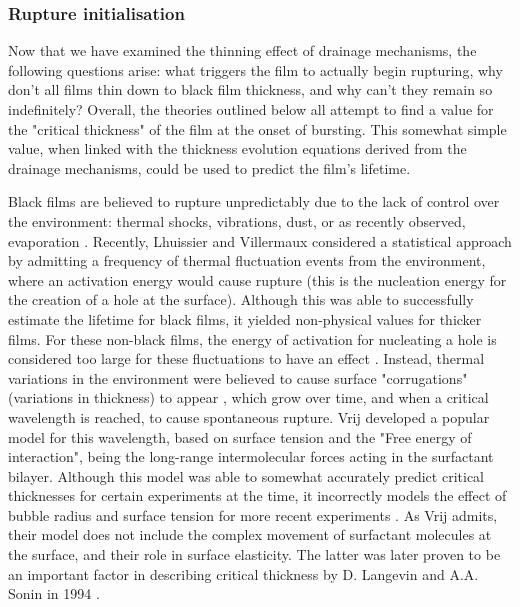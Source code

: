 \documentclass[a4paper,12pt]{article}
\numberwithin{equation}{section}
\numberwithin{figure}{section}
\numberwithin{table}{section}
\begin{document}
\subsubsection{Rupture initialisation}
Now that we have examined the thinning effect of drainage mechanisms, the following questions arise: what triggers the film to actually begin rupturing, why don't all films thin down to black film thickness, and why can't they remain so indefinitely? Overall, the theories outlined below all attempt to find a value for the "critical thickness" of the film at the onset of bursting. This somewhat simple value, when linked with the thickness evolution equations derived from the drainage mechanisms, could be used to predict the film's lifetime.

Black films are believed to rupture unpredictably due to the lack of control over the environment: thermal shocks, vibrations, dust, or as recently observed, evaporation \cite{Vrij1968, ChampougnyEvap2018}. Recently, Lhuissier and Villermaux \cite{Lhuissier2011} considered a statistical approach by admitting a frequency of thermal fluctuation events from the environment, where an activation energy would cause rupture (this is the nucleation energy for the creation of a hole at the surface). Although this was able to successfully estimate the lifetime for black films, it yielded non-physical values for thicker films. For these non-black films, the energy of activation for nucleating a hole is considered too large for these fluctuations to have an effect \cite{VrijDiscussion1966}. Instead, thermal variations in the environment were believed to cause surface "corrugations" (variations in thickness) to appear \cite{Vrij1968, VrijDiscussion1966}, which grow over time, and when a critical wavelength is reached, to cause spontaneous rupture. Vrij developed a popular model for this wavelength, based on surface tension and the "Free energy of interaction", being the long-range intermolecular forces acting in the surfactant bilayer. Although this model was able to somewhat accurately predict critical thicknesses for certain experiments at the time, it incorrectly models the effect of bubble radius and surface tension for more recent experiments \cite{Langevin1994}. As Vrij admits, their model does not include the complex movement of surfactant molecules at the surface, and their role in surface elasticity. The latter was later proven to be an important factor in describing critical thickness by D. Langevin and A.A. Sonin in 1994 \cite{Langevin1994}.
\end{document}

